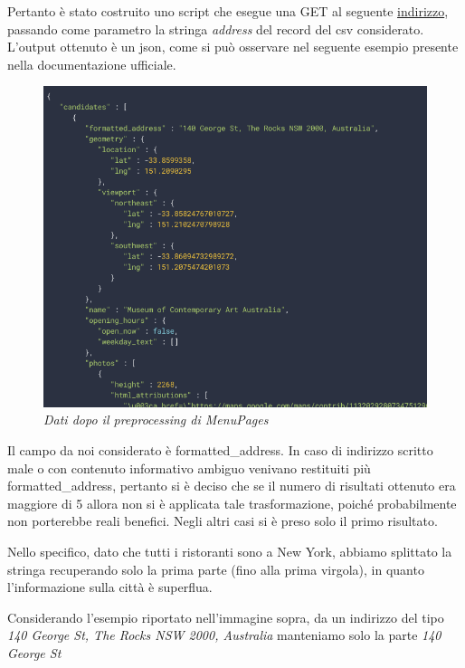 \documentclass[a4paper,12pt]{article}
\begin{document}
\noindent Pertanto è stato costruito uno script che esegue una GET al seguente \href{https://maps.googleapis.com/maps/api/place/textsearch/json }{indirizzo}, passando come parametro la stringa \textit{address} del record del csv considerato. L'output ottenuto è un json, come si può osservare nel seguente esempio presente nella documentazione ufficiale.

\begin{figure}[H]
	\centering
	\includegraphics[width=0.8\linewidth]{img/img.png}
	\caption{\textit{Dati dopo il preprocessing di MenuPages}}
\end{figure}

\noindent Il campo da noi considerato è formatted\_address. In caso di indirizzo scritto male o con contenuto informativo ambiguo venivano restituiti più formatted\_address, pertanto si è deciso che se il numero di risultati ottenuto era maggiore di 5 allora non si è applicata tale trasformazione, poiché probabilmente non porterebbe reali benefici. Negli altri casi si è preso solo il primo risultato. 

\noindent Nello specifico,  dato che tutti i ristoranti sono a New York, abbiamo splittato la stringa recuperando solo la prima parte (fino alla prima virgola), in quanto l'informazione sulla città è superflua. 
 
Considerando l'esempio riportato nell'immagine sopra, da un indirizzo del tipo \textit{140 George St, The Rocks NSW 2000, Australia} manteniamo solo la parte \textit{140 George St}
\end{document}
